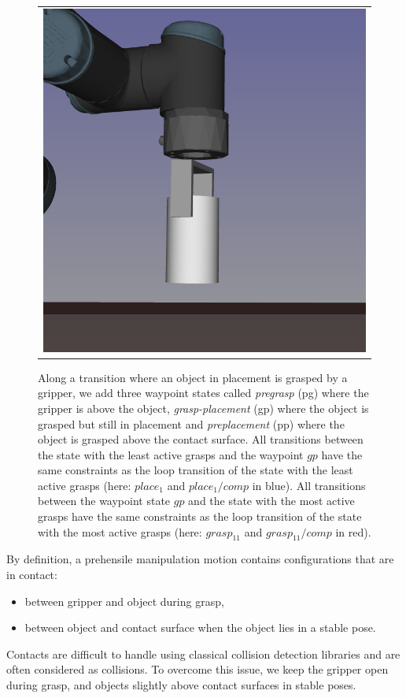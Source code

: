 \begin{figure}
{{\begin {tabular}{c}
      \includegraphics [width=.9\linewidth] {figures/placement-preplace-ur3.png}\\
      \end{tabular}
    }
  }
  \caption{Along a transition where an object in placement is grasped
    by a gripper, we add three waypoint states called
    \textit{pregrasp} (pg) where the gripper is above the object,
    \textit{grasp-placement} (gp) where the object is grasped but
    still in placement and \textit{preplacement} (pp) where the object
    is grasped above the contact surface. All transitions between the
    state with the least active grasps and the waypoint $gp$ have the
    same constraints as the loop transition of the state with the
    least active grasps (here: $place_1$ and $place_1/comp$ in
    blue). All transitions between the waypoint state $gp$ and the
    state with the most active grasps have the same constraints as the
    loop transition of the state with the most active grasps (here: $grasp_{11}$
    and $grasp_{11}/comp$ in red).}
  \label{fig:pregrasp-placement}
\end{figure}

By definition, a prehensile manipulation motion contains configurations that are in contact:
\begin{itemize}
\item between gripper and object during grasp,
\item between object and contact surface when the object lies in a stable pose.
\end{itemize}
Contacts are difficult to handle using classical collision detection libraries and are often considered as collisions. To overcome this issue, we keep the gripper open during grasp, and objects slightly above contact surfaces in stable poses.


